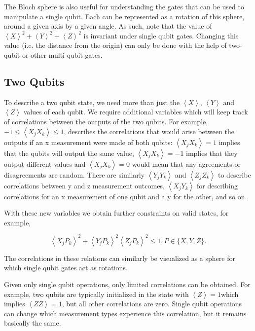 \documentclass[conference]{IEEEtran}
\begin{document}
The Bloch sphere is also useful for understanding the gates that can be used to manipulate a single qubit. Each can be represented as a rotation of this sphere, around a given axis by a given angle. As such, note that the value of $\left\langle X\right\rangle^2 + \left\langle Y\right\rangle^2 + \left\langle Z\right\rangle^2$ is invariant under single qubit gates. Changing this value (i.e. the distance from the origin) can only be done with the help of two-qubit or other multi-qubit gates.


\subsection{Two Qubits}

To describe a two qubit state, we need more than just the $\left\langle X\right\rangle$, $\left\langle Y\right\rangle$ and $\left\langle Z\right\rangle$  values of each qubit. We require additional variables which will keep track of correlations between the outputs of the two qubits. For example, $-1 \leq \left\langle X_j X_k \right\rangle \leq 1$, describes the correlations that would arise between the outputs if an x measurement were made of both qubits: $\left\langle X_j X_k\right\rangle = 1$ implies that the qubits will output the same value, $\left\langle X_j X_k\right\rangle = -1$ implies that they output different values and $\left\langle X_j X_k\right\rangle = 0$ would mean that any agreements or disagreements are random. There are similarly $\left\langle Y_j Y_k\right\rangle$ and $\left\langle Z_j Z_k\right\rangle$ to describe correlations between y and z measurement outcomes, $\left\langle X_j Y_k \right\rangle$ for describing correlations for an x measurement of one qubit and a y for the other, and so on.

With these new variables we obtain further constraints on valid states, for example,

\begin{equation} \label{heisenberg2}
\left\langle X_j P_k \right\rangle^2 + \left\langle Y_j P_k \right\rangle^2 \left\langle Z_j P_k \right\rangle^2 \leq 1, P \in \{X,Y,Z\}.
\end{equation}

The correlations in these relations can similarly be visualized as a sphere for which single qubit gates act as rotations.

Given only single qubit operations, only limited correlations can be obtained. For example, two qubits are typically initialized in the state with $\left\langle Z\right\rangle =1$which implies $\left\langle ZZ\right\rangle =1$, but all other correlations are zero. Single qubit operations can change which measurement types experience this correlation, but it remains basically the same.
\end{document}
